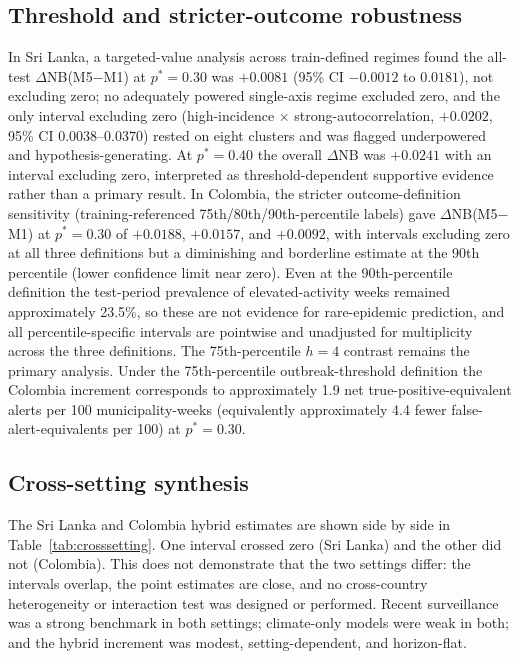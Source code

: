 \documentclass[11pt,a4paper]{article}
\begin{document}
\subsection{Threshold and stricter-outcome robustness}
In Sri Lanka, a targeted-value analysis across train-defined regimes found the all-test $\Delta$NB(M5$-$M1) at $p^*=0.30$ was $+0.0081$ (95\% CI $-0.0012$ to $0.0181$), not excluding zero; no adequately powered single-axis regime excluded zero, and the only interval excluding zero (high-incidence $\times$ strong-autocorrelation, $+0.0202$, 95\% CI $0.0038$--$0.0370$) rested on eight clusters and was flagged underpowered and hypothesis-generating. At $p^*=0.40$ the overall $\Delta$NB was $+0.0241$ with an interval excluding zero, interpreted as threshold-dependent supportive evidence rather than a primary result. In Colombia, the stricter outcome-definition sensitivity (training-referenced 75th/80th/90th-percentile labels) gave $\Delta$NB(M5$-$M1) at $p^*=0.30$ of $+0.0188$, $+0.0157$, and $+0.0092$, with intervals excluding zero at all three definitions but a diminishing and borderline estimate at the 90th percentile (lower confidence limit near zero). Even at the 90th-percentile definition the test-period prevalence of elevated-activity weeks remained approximately 23.5\%, so these are not evidence for rare-epidemic prediction, and all percentile-specific intervals are pointwise and unadjusted for multiplicity across the three definitions. The 75th-percentile $h=4$ contrast remains the primary analysis. Under the 75th-percentile outbreak-threshold definition the Colombia increment corresponds to approximately 1.9 net true-positive-equivalent alerts per 100 municipality-weeks (equivalently approximately 4.4 fewer false-alert-equivalents per 100) at $p^*=0.30$.

\subsection{Cross-setting synthesis}
The Sri Lanka and Colombia hybrid estimates are shown side by side in Table~\ref{tab:crosssetting}. One interval crossed zero (Sri Lanka) and the other did not (Colombia). This does not demonstrate that the two settings differ: the intervals overlap, the point estimates are close, and no cross-country heterogeneity or interaction test was designed or performed. Recent surveillance was a strong benchmark in both settings; climate-only models were weak in both; and the hybrid increment was modest, setting-dependent, and horizon-flat.
\end{document}
